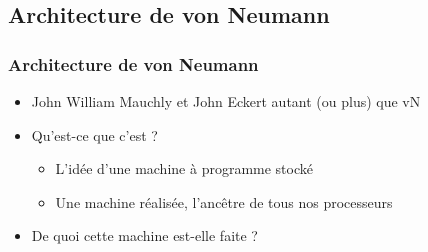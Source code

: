 \documentclass[xcolor=svgnames]{beamer}
\begin{document}
\subsection{Architecture de von Neumann}
\begin{frame}
  \frametitle{Architecture de von Neumann\nowrite}
  \begin{itemize}
  \item John William Mauchly et John Eckert autant (ou plus) que
    vN\pause
  \item Qu'est-ce que c'est ?\pause
    \begin{itemize}
    \item L'idée d'une machine à \alert{programme
        stocké}\pause
    \item  Une machine réalisée, l'ancêtre de tous nos processeurs\pause
    \end{itemize}
  \item De quoi  cette machine est-elle faite ?\pause
  \begin{columns}[t]
  \begin{column}{4cm}
\centering
{}


\end{column}
\end{columns}
\end{itemize}
\end{frame}
\end{document}
